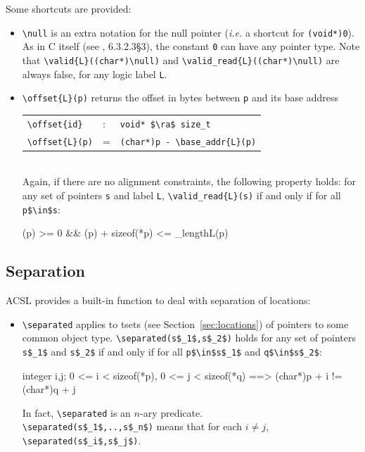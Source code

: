 Some shortcuts are provided:
\begin{itemize}
\item \lstinline|\null| is an
  extra notation for the
  null pointer (\emph{i.e.} a shortcut for \lstinline|(void*)0|).
  As in C itself (see \cite{standardc99}, 6.3.2.3\S3),
  the constant \lstinline|0| can have any pointer type. Note that
  \lstinline|\valid{L}((char*)\null)| and \lstinline|\valid_read{L}((char*)\null)|
  are always false, for any
  logic label \lstinline|L|.
\item \lstinline|\offset{L}(p)|%
  returns the offset in bytes between \lstinline|p| and its base address
\\ \makebox[5mm]{} \begin{tabular}{lll}
    \lstinline|\offset{id}| &:& \lstinline|void* $\ra$ size_t| \\
    \lstinline|\offset{L}(p)| &=& \lstinline|(char*)p - \base_addr{L}(p)| \\
  \end{tabular} \\
Again, if there are no alignment constraints,
  the following property holds: for any set of pointers
\lstinline|s| and label \lstinline|L|, \lstinline|\valid_read{L}(s)| if and only if for all \lstinline|p$\in$s|:
  \begin{listing-nonumber}
    (p) >= 0 && (p) + sizeof(*p) <= \block_length{L}(p)
  \end{listing-nonumber}

\end{itemize}

\subsection{Separation}\label{sec:separated}

ACSL provides a built-in function to deal with separation of locations:

\begin{itemize}
\item \lstinline|\separated|
applies to tsets (see Section~\ref{sec:locations}) of pointers
to some common object type.
\lstinline|\separated(s$_1$,s$_2$)|
holds for any set of pointers \lstinline|s$_1$| and \lstinline|s$_2$|
if and only if for all \lstinline|p$\in$s$_1$| and \lstinline|q$\in$s$_2$|:
\begin{listing-nonumber}
\forall integer i,j; 0 <= i < sizeof(*p), 0 <= j < sizeof(*q) ==>
  (char*)p + i != (char*)q + j
\end{listing-nonumber}

In fact, \lstinline|\separated| is an $n$-ary predicate.\\
\lstinline|\separated(s$_1$,..,s$_n$)| means
that for each
$i\neq j$, \lstinline|\separated(s$_i$,s$_j$)|.
\end{itemize}

